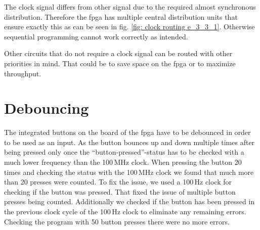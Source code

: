 %

%

%



The clock signal differs from other signal due to the required almost synchronous distribution. Therefore the \gls{fpga} has multiple central distribution units that ensure exactly this as can be seen in fig. \ref{fig: clock routing e_3_3_1}. Otherwise sequential programming cannot work correctly as intended.

Other circuits that do not require a clock signal can be routed with other priorities in mind. That could be to save space on the \gls{fpga} or to maximize throughput. 

\section{Debouncing}

The integrated buttons on the board of the \gls{fpga} have to be debounced in order to be used as an input. As the button bounces up and down multiple times after being pressed only once the ``button-pressed''-status has to be checked with a much lower frequency than the 100\,MHz clock. When pressing the button 20 times and checking the status with the 100\,MHz clock we found that much more than 20 presses were counted. To fix the issue, we used a 100\,Hz clock for checking if the button was pressed. That fixed the issue of multiple button presses being counted. Additionally we checked if the button has been pressed in the previous clock cycle of the 100\,Hz clock to eliminate any remaining errors. Checking the program with 50 button presses there were no more errors.





